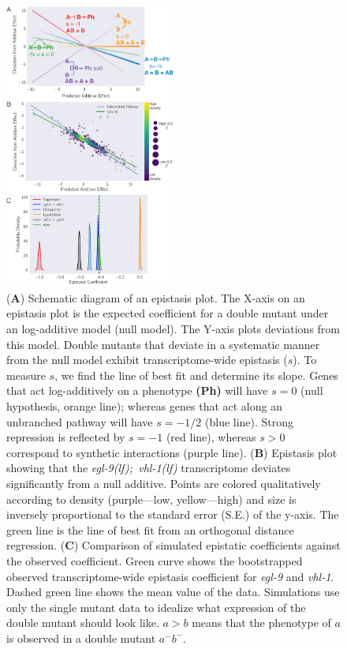 \documentclass[9pt,twocolumn,twoside]{pnas-new}
\newcommand{\gene}[1]{\mbox{\emph{#1}}}
\newcommand{\eglvhl}{\gene{egl-9(lf); vhl-1(lf)}}
\begin{document}
\begin{figure}[tbhp]
  \centering
  \includegraphics[width=0.5\textwidth]{../figs/egl9vhl1-epistasis.pdf}
  \caption{
    (\textbf{A}) Schematic diagram of an epistasis plot. The X-axis on an
    epistasis plot is the expected coefficient for a double mutant under an
    log-additive model (null model). The Y-axis plots deviations from this
    model. Double mutants that deviate in a systematic manner from the null
    model exhibit transcriptome-wide epistasis ($s$). To measure $s$, we find
    the line of best fit and determine its slope. Genes that act log-additively
    on a phenotype \textbf{(Ph)} will have $s=0$ (null hypothesis, orange line);
    whereas genes that act along an unbranched pathway will have $s=-1/2$ (blue
    line). Strong repression is reflected by $s=-1$ (red line), whereas $s>0$
    correspond to synthetic interactions (purple line). (\textbf{B}) Epistasis
    plot showing that the \eglvhl{} transcriptome deviates significantly from a
    null additive. Points are colored qualitatively according to density
    (purple---low, yellow---high) and size is inversely proportional to the
    standard error (S.E.) of the y-axis. The green line is the line of best fit
    from an orthogonal distance regression. (\textbf{C}) Comparison of simulated
    epistatic coefficients against the observed coefficient. Green curve shows
    the bootstrapped observed transcriptome-wide epistasis coefficient for
    \gene{egl-9} and \gene{vhl-1}. Dashed green line shows the mean value of the
    data. Simulations use only the single mutant data to idealize what
    expression of the double mutant should look like. $a > b$ means that the
    phenotype of $a$ is observed in a double mutant $a^-b^-$. }
\label{fig:egl9epistasis}
\end{figure}
\end{document}
